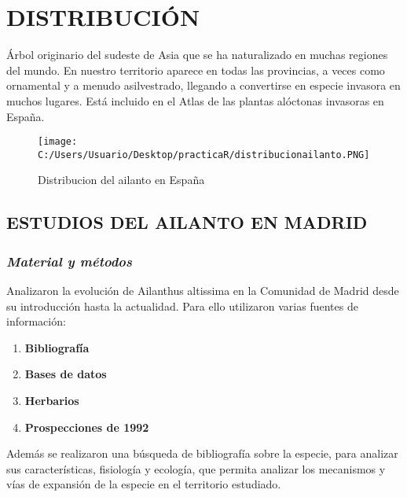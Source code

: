 \documentclass[
]{article}
\begin{document}
\hypertarget{distribuciuxf3n}{%
\section{\texorpdfstring{\textbf{DISTRIBUCIÓN}}{DISTRIBUCIÓN}}\label{distribuciuxf3n}}

Árbol originario del sudeste de Asia que se ha naturalizado en muchas
regiones del mundo. En nuestro territorio aparece en todas las
provincias, a veces como ornamental y a menudo asilvestrado, llegando a
convertirse en especie invasora en muchos lugares. Está incluido en el
Atlas de las plantas alóctonas invasoras en España.

\begin{figure}
\centering
\texttt{[image: C:/Users/Usuario/Desktop/practicaR/distribucionailanto.PNG]}
\caption{Distribucion del ailanto en España}
\end{figure}

\hypertarget{estudios-del-ailanto-en-madrid}{%
\subsection{\texorpdfstring{\textbf{ESTUDIOS DEL AILANTO EN
MADRID}}{ESTUDIOS DEL AILANTO EN MADRID}}\label{estudios-del-ailanto-en-madrid}}

\hypertarget{material-y-muxe9todos}{%
\subsubsection{\texorpdfstring{\emph{Material y
métodos}}{Material y métodos}}\label{material-y-muxe9todos}}

Analizaron la evolución de Ailanthus altissima en la Comunidad de Madrid
desde su introducción hasta la actualidad. Para ello utilizaron varias
fuentes de información:

\begin{enumerate}
\def\labelenumi{\alph{enumi})}
\item
  \textbf{Bibliografía}
\item
  \textbf{Bases de datos}
\item
  \textbf{Herbarios}
\item
  \textbf{Prospecciones de 1992}
\end{enumerate}

Además se realizaron una búsqueda de bibliografía sobre la especie, para
analizar sus características, fisiología y ecología, que permita
analizar los mecanismos y vías de expansión de la especie en el
territorio estudiado.
\end{document}

